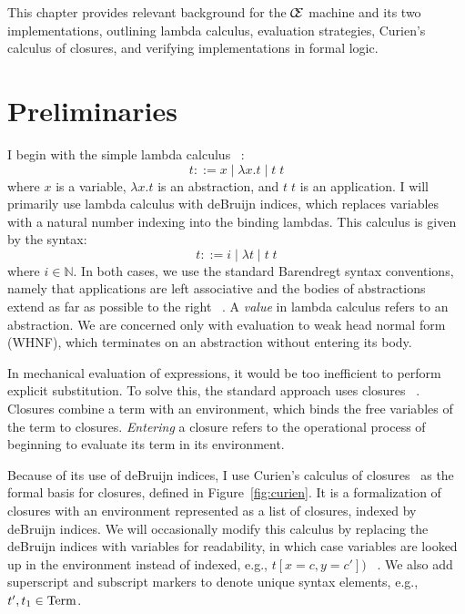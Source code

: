 This chapter provides relevant background for the $\mathcal{\mathcal{C} \mskip
-4mu \mathcal{E}}$ machine and its two implementations, outlining lambda
calculus, evaluation strategies, Curien's calculus of closures, and verifying
implementations in formal logic. 

\section{Preliminaries} \label{sec:prelim}

I begin with the simple lambda calculus ~\cite{barendregt1984lambda}:  $$ t::= x
\; | \;  \lambda x.t \; | \;  t \; t $$ where $x$ is a variable, $\lambda x.t$
is an abstraction, and $t \; t$ is an application. I will primarily use lambda
calculus with deBruijn indices, which replaces variables with a natural number
indexing into the binding lambdas.  This calculus is given by the syntax: $$
t::= i \; | \; \lambda t \; | \; t \; t $$ where $i \in \mathbb{N}$. In both
cases, we use the standard Barendregt syntax conventions, namely that
applications are left associative and the bodies of abstractions extend as far
as possible to the right ~\cite{barendregt1984lambda}.  A \emph{value} in lambda
calculus refers to an abstraction. We are concerned only with evaluation to weak
head normal form (WHNF), which terminates on an abstraction without entering its
body.

In mechanical evaluation of expressions, it would be too inefficient to perform
explicit substitution. To solve this, the standard approach uses closures
~\cite{landin1964mechanical,curien1991abstract,jonesstg,biernacka2007concrete}.
Closures combine a term with an environment, which binds the free variables of
the term to closures. \emph{Entering} a closure refers to the operational
process of beginning to evaluate its term in its environment.

Because of its use of deBruijn indices, I use Curien's calculus of
closures~\cite{curien1991abstract} as the formal basis for closures,
defined in Figure~\ref{fig:curien}. It is a formalization of closures with an
environment represented as a list of closures, indexed by deBruijn indices. We
will occasionally modify this calculus by replacing the deBruijn indices with
variables for readability, in which case variables are looked up in the
environment instead of indexed, e.g., $t[x = c, y = c'])$
~\cite{barendregt1984lambda}. We also add superscript and subscript markers to
denote unique syntax elements, e.g., $t', t_1 \in \textnormal{Term}$. 

